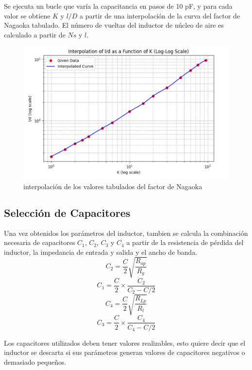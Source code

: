 Se ejecuta un bucle que varía la capacitancia en pasos de 10 pF, y para cada valor se obtiene $K$ y $l/D$ a partir de una interpolación de la curva del factor de Nagaoka tabulado. El número de vueltas del inductor de núcleo de aire es calculado a partir de $Ns$ y $l$.

\begin{figure}[H]
    \centering
    \includegraphics[width=0.5\linewidth]{fig/interpolacion.png}
    \caption{interpolación de los valores tabulados del factor de Nagaoka}
    \label{fig:enter-label}
\end{figure}

\subsection{Selección de Capacitores}

Una vez obtenidos los parámetros del inductor, tambien se calcula la combinación necesaria de capacitores $C_1$, $C_2$, $C_3$ y $C_4$ a partir de la resistencia de pérdida del inductor, la impedancia de entrada y salida y el ancho de banda.
$$
    C_2 = \frac{C}{2} \sqrt{\frac{R_{ap}}{R_g}}
$$
$$
    C_1 = \frac{C}{2} \times \frac{C_2}{C_2 - C/2} 
$$
$$
    C_4 = \frac{C}{2} \sqrt{\frac{R_{Lp}}{R_l}} 
$$
$$
C_3 = \frac{C}{2} \times \frac{C_4}{C_4 - C/2} 
$$

Los capacitores utilizados deben tener valores realizables, esto quiere decir que el inductor se descarta si sus parámetros generan valores de capacitores negativos o demasiado pequeños.

